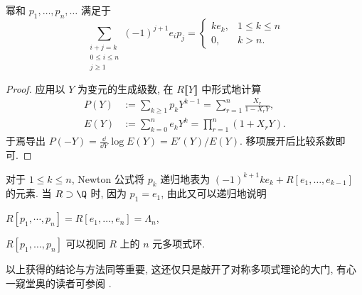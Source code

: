 \begin{theorem}[Newton 公式] 
	幂和 $p_1, \ldots, p_n, \ldots$ 满足于
	\[ \sum_{\substack{i+j=k \\ 0 \leq i \leq n \\ j \geq 1}} (-1)^{j+1} e_i p_j =
	\begin{cases}
		k e_k, & 1 \leq k \leq n \\
		0, & k > n.
	\end{cases}\]
\end{theorem}
\begin{proof}
	应用以 $Y$ 为变元的生成级数, 在 $R\llbracket Y \rrbracket$ 中形式地计算
	\begin{align*}
		P(Y) & := \sum_{k \geq 1} p_k Y^{k-1} = \sum_{r=1}^n \frac{X_r}{1 - X_r Y}, \\
		E(Y) & := \sum_{k=0}^n e_k Y^k = \prod_{r=1}^n (1 + X_r Y).
	\end{align*}
	于焉导出 $P(-Y) = \frac{\dd}{\dd Y} \log E(Y) = E'(Y)/E(Y)$. 移项展开后比较系数即可.
\end{proof}
对于 $1 \leq k \leq n$, Newton 公式将 $p_k$ 递归地表为 $(-1)^{k+1} k e_k + R[e_1, \ldots, e_{k-1}]$ 的元素. 当 $R \supset \Q$ 时, 因为 $p_1 = e_1$, 由此又可以递归地说明
\begin{compactitem}
	\item $R[p_1, \cdots, p_n] = R[e_1, \ldots, e_n] = \Lambda_n$,
	\item $R[p_1, \ldots, p_n]$ 可以视同 $R$ 上的 $n$ 元多项式环.
\end{compactitem}

以上获得的结论与方法同等重要, 这还仅只是敲开了对称多项式理论的大门, 有心一窥堂奥的读者可参阅 \cite{Mac95}.


